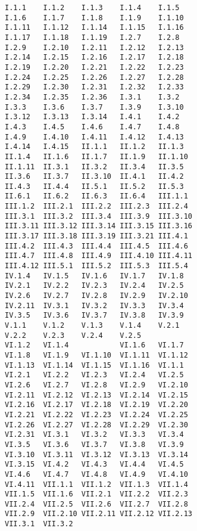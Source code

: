 \documentclass[main.tex]{subfiles}
\begin{document}
\noindent
\begin{verbatim}
I.1.1    I.1.2    I.1.3    I.1.4    I.1.5
I.1.6    I.1.7    I.1.8    I.1.9    I.1.10
I.1.11   I.1.12   I.1.14   I.1.15   I.1.16
I.1.17   I.1.18   I.1.19   I.2.7    I.2.8
I.2.9    I.2.10   I.2.11   I.2.12   I.2.13
I.2.14   I.2.15   I.2.16   I.2.17   I.2.18
I.2.19   I.2.20   I.2.21   I.2.22   I.2.23
I.2.24   I.2.25   I.2.26   I.2.27   I.2.28
I.2.29   I.2.30   I.2.31   I.2.32   I.2.33
I.2.34   I.2.35   I.2.36   I.3.1    I.3.2
I.3.3    I.3.6    I.3.7    I.3.9    I.3.10
I.3.12   I.3.13   I.3.14   I.4.1    I.4.2
I.4.3    I.4.5    I.4.6    I.4.7    I.4.8
I.4.9    I.4.10   I.4.11   I.4.12   I.4.13
I.4.14   I.4.15   II.1.1   II.1.2   II.1.3
II.1.4   II.1.6   II.1.7   II.1.9   II.1.10
II.1.11  II.3.1   II.3.2   II.3.4   II.3.5
II.3.6   II.3.7   II.3.10  II.4.1   II.4.2
II.4.3   II.4.4   II.5.1   II.5.2   II.5.3
II.6.1   II.6.2   II.6.3   II.6.4   III.1.1
III.1.2  III.2.1  III.2.2  III.2.3  III.2.4
III.3.1  III.3.2  III.3.4  III.3.9  III.3.10
III.3.11 III.3.12 III.3.14 III.3.15 III.3.16
III.3.17 III.3.18 III.3.19 III.3.21 III.4.1
III.4.2  III.4.3  III.4.4  III.4.5  III.4.6
III.4.7  III.4.8  III.4.9  III.4.10 III.4.11
III.4.12 III.5.1  III.5.2  III.5.3  III.5.4
IV.1.4   IV.1.5   IV.1.6   IV.1.7   IV.1.8
IV.2.1   IV.2.2   IV.2.3   IV.2.4   IV.2.5
IV.2.6   IV.2.7   IV.2.8   IV.2.9   IV.2.10
IV.2.11  IV.3.1   IV.3.2   IV.3.3   IV.3.4
IV.3.5   IV.3.6   IV.3.7   IV.3.8   IV.3.9
V.1.1    V.1.2    V.1.3    V.1.4    V.2.1
V.2.2    V.2.3    V.2.4    V.2.5           
VI.1.2   VI.1.4            VI.1.6   VI.1.7
VI.1.8   VI.1.9   VI.1.10  VI.1.11  VI.1.12
VI.1.13  VI.1.14  VI.1.15  VI.1.16  VI.1.1
VI.2.1   VI.2.2   VI.2.3   VI.2.4   VI.2.5
VI.2.6   VI.2.7   VI.2.8   VI.2.9   VI.2.10
VI.2.11  VI.2.12  VI.2.13  VI.2.14  VI.2.15
VI.2.16  VI.2.17  VI.2.18  VI.2.19  VI.2.20
VI.2.21  VI.2.22  VI.2.23  VI.2.24  VI.2.25
VI.2.26  VI.2.27  VI.2.28  VI.2.29  VI.2.30
VI.2.31  VI.3.1   VI.3.2   VI.3.3   VI.3.4
VI.3.5   VI.3.6   VI.3.7   VI.3.8   VI.3.9
VI.3.10  VI.3.11  VI.3.12  VI.3.13  VI.3.14
VI.3.15  VI.4.2   VI.4.3   VI.4.4   VI.4.5
VI.4.6   VI.4.7   VI.4.8   VI.4.9   VI.4.10
VI.4.11  VII.1.1  VII.1.2  VII.1.3  VII.1.4
VII.1.5  VII.1.6  VII.2.1  VII.2.2  VII.2.3
VII.2.4  VII.2.5  VII.2.6  VII.2.7  VII.2.8
VII.2.9  VII.2.10 VII.2.11 VII.2.12 VII.2.13
VII.3.1  VII.3.2
\end{verbatim}
\end{document}

